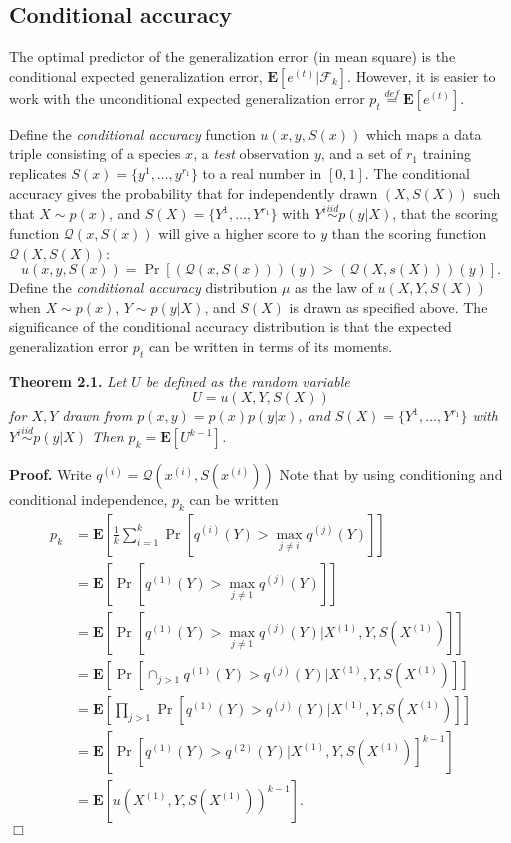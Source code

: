 \documentclass{article}
\newcommand{\E}{\textbf{E}}
\begin{document}
\subsection{Conditional accuracy}

The optimal predictor of the generalization error (in mean square) is
the conditional expected generalization error,
$\E[e^{(t)}|\mathcal{F}_k]$.  However, it is easier to work with the
unconditional expected generalization error $p_t \stackrel{def}{=}
\E[e^{(t)}]$.

Define the \emph{conditional accuracy} function $u(x, y, S(x))$ which
maps a data triple consisting of a species $x$, a \emph{test}
observation $y$, and a set of $r_1$ training replicates $S(x) =
\{y^{1}, \hdots, y^{r_1}\}$ to a real number in $[0,1]$.  The
conditional accuracy gives the probability that for independently
drawn $(X, S(X))$ such that $X \sim p(x)$, and $S(X) = \{Y^1,\hdots,
Y^{r_1}\}$ with $Y^i \stackrel{iid}{\sim} p(y|X)$, that the scoring
function $\mathcal{Q}(x, S(x))$ will give a higher score to $y$ than
the scoring function $\mathcal{Q}(X, S(X))$:
\[
u(x, y, S(x)) = \Pr[(\mathcal{Q}(x, S(x)))(y) > (\mathcal{Q}(X, s(X)))(y)].
\]
Define the \emph{conditional accuracy} distribution $\mu$ as the law of
$u(X, Y, S(X))$ when $X \sim p(x)$, $Y\sim p(y|X)$, and $S(X)$ is
drawn as specified above.  The significance of the conditional
accuracy distribution is that the expected generalization error $p_t$
can be written in terms of its moments.

\noindent\textbf{Theorem 2.1.} \emph{
Let $U$ be defined as the random variable
\[U = u(X, Y, S(X))\]
for $X, Y$ drawn from $p(x, y) = p(x) p(y|x)$,
and $S(X) = \{Y^1,\hdots, Y^{r_1}\}$ with $Y^i \stackrel{iid}{\sim} p(y|X)$
Then $p_k = \E[U^{k-1}]$.
}

\noindent\textbf{Proof.}  
Write $q^{(i)} = \mathcal{Q}(x^{(i)}, S(x^{(i)}))$
Note that by using conditioning and
conditional independence, $p_k$ can be written
\begin{align*}
p_k &= \E\left[ \frac{1}{k}\sum_{i=1}^k  \Pr[q^{(i)}(Y) > \max_{j\neq i} q^{(j)}(Y)] \right]
\\&= \E\left[ \Pr[q^{(1)}(Y) > \max_{j\neq 1} q^{(j)}(Y)] \right]
\\&= \E[\Pr[q^{(1)}(Y) > \max_{j\neq 1} q^{(j)}(Y)|X^{(1)}, Y, S(X^{(1)})]]
\\&= \E[\Pr[\cap_{j > 1} q^{(1)}(Y) > q^{(j)}(Y)|X^{(1)}, Y, S(X^{(1)})]]
\\&= \E[\prod_{j > 1}\Pr[q^{(1)}(Y) > q^{(j)}(Y)|X^{(1)}, Y, S(X^{(1)})]]
\\&= \E[\Pr[q^{(1)}(Y) > q^{(2)}(Y)|X^{(1)}, Y, S(X^{(1)})]^{k-1}]
\\&= \E[u(X^{(1)}, Y, S(X^{(1)}))^{k-1}].
\end{align*}
$\Box$
\end{document}
